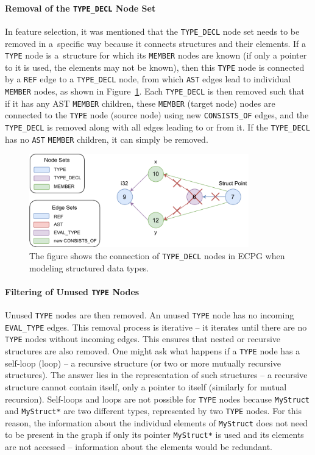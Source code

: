 \paragraph{Removal of the \texttt{TYPE\_DECL} Node Set}
In feature selection, it was mentioned that the \texttt{TYPE\_DECL} node set needs to be removed in a~specific way because it connects structures and their elements. If a \texttt{TYPE} node is a~structure for which its \texttt{MEMBER} nodes are known (if only a pointer to it is used, the elements may not be known), then this \texttt{TYPE} node is connected by a \texttt{REF} edge to a \texttt{TYPE\_DECL} node, from which \texttt{AST} edges lead to individual \texttt{MEMBER} nodes, as shown in Figure~\ref{figure:struct}. Each \texttt{TYPE\_DECL} is then removed such that if it has any AST \texttt{MEMBER} children, these \texttt{MEMBER} (target node) nodes are connected to the \texttt{TYPE} node (source node) using new \texttt{CONSISTS\_OF} edges, and the \texttt{TYPE\_DECL} is removed along with all edges leading to or from it. If the \texttt{TYPE\_DECL} has no \texttt{AST} \texttt{MEMBER} children, it can simply be removed.

\begin{figure}[t]
	\centering
	\includegraphics[width=0.85\textwidth]{figures/ecpg-struct.pdf}
	\caption{The figure shows the connection of \texttt{TYPE\_DECL} nodes in ECPG when modeling structured data types.}
	\label{figure:struct}
\end{figure}

\paragraph{Filtering of Unused \texttt{TYPE} Nodes}
Unused \texttt{TYPE} nodes are then removed. An unused \texttt{TYPE} node has no incoming \texttt{EVAL\_TYPE} edges. This removal process is iterative -- it iterates until there are no \texttt{TYPE} nodes without incoming edges. This ensures that nested or recursive structures are also removed. One might ask what happens if a \texttt{TYPE} node has a self-loop (loop) -- a recursive structure (or two or more mutually recursive structures). The answer lies in the representation of such structures -- a recursive structure cannot contain itself, only a pointer to itself (similarly for mutual recursion). Self-loops and loops are not possible for \texttt{TYPE} nodes because \texttt{MyStruct} and \texttt{MyStruct*} are two different types, represented by two \texttt{TYPE} nodes. For this reason, the information about the individual elements of \texttt{MyStruct} does not need to be present in the graph if only its pointer \texttt{MyStruct*} is used and its elements are not accessed -- information about the elements would be redundant.

